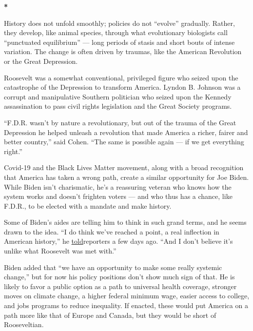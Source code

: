 \textbf{*}

History does not unfold smoothly; policies do not ``evolve'' gradually.
Rather, they develop, like animal species, through what evolutionary
biologists call ``punctuated equilibrium'' --- long periods of stasis
and short bouts of intense variation. The change is often driven by
traumas, like the American Revolution or the Great Depression.

Roosevelt was a somewhat conventional, privileged figure who seized upon
the catastrophe of the Depression to transform America. Lyndon B.
Johnson was a corrupt and manipulative Southern politician who seized
upon the Kennedy assassination to pass civil rights legislation and the
Great Society programs.

``F.D.R. wasn't by nature a revolutionary, but out of the trauma of the
Great Depression he helped unleash a revolution that made America a
richer, fairer and better country,'' said Cohen. ``The same is possible
again --- if we get everything right.''

Covid-19 and the Black Lives Matter movement, along with a broad
recognition that America has taken a wrong path, create a similar
opportunity for Joe Biden. While Biden isn't charismatic, he's a
reassuring veteran who knows how the system works and doesn't frighten
voters --- and who thus has a chance, like F.D.R., to be elected with a
mandate and make history.

Some of Biden's aides are telling him to think in such grand terms, and
he seems drawn to the idea. ``I do think we've reached a point, a real
inflection in American history,'' he
\href{https://messaging-custom-newsletters.nytimes3xbfgragh.onion/template/oakv2?campaign_id=9\&emc=edit_nn_20200714\&instance_id=20286\&nl=the-morning\&productCode=NN\&regi_id=12554495\&segment_id=33336\&te=1\&uri=nyt\%3A\%2F\%2Fnewsletter\%2Fa6802831-0f40-574e-a8a0-3f5125146b8d\&user_id=a949928698e00ffba23b348eabe9c588}{told}reporters
a few days ago. ``And I don't believe it's unlike what Roosevelt was met
with.''

Biden added that ``we have an opportunity to make some really systemic
change,'' but for now his policy positions don't show much sign of that.
He is likely to favor a public option as a path to universal health
coverage, stronger moves on climate change, a higher federal minimum
wage, easier access to college, and jobs programs to reduce inequality.
If enacted, these would put America on a path more like that of Europe
and Canada, but they would be short of Rooseveltian.

